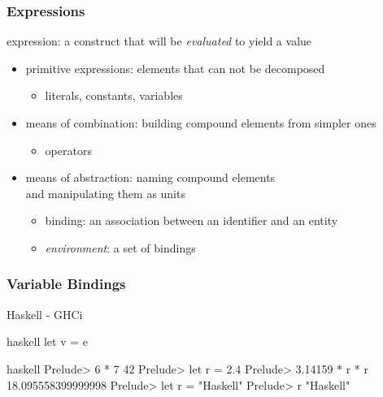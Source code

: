 \documentclass[dvipsnames]{beamer}
\theoremstyle{plain}
\begin{document}
\begin{frame}
  \frametitle{Expressions}

  \begin{definition}
    \alert{expression}: a construct that will be \emph{evaluated} to yield a value
  \end{definition}

  \pause
  \medskip
  \begin{itemize}
    \item primitive expressions: elements that can not be decomposed\\
    \begin{itemize}
      \item literals, constants, variables
    \end{itemize}
    \item means of combination: building compound elements from simpler ones\\
    \begin{itemize}
      \item operators
    \end{itemize}
    \item means of abstraction: naming compound elements\\
      and manipulating them as units
    \begin{itemize}
      \item \alert{binding}: an association between an identifier and an entity
      \item \emph{environment}: a set of bindings
    \end{itemize}
  \end{itemize}
\end{frame}

\begin{frame}[fragile]
  \frametitle{Variable Bindings}

  \begin{block}{Haskell - GHCi}
    \begin{pygments}{haskell}
let v = e
    \end{pygments}
  \end{block}

  \begin{example}
    \begin{pygments}{haskell}
Prelude> 6 * 7
42
Prelude> let r = 2.4
Prelude> 3.14159 * r * r
18.095558399999998
Prelude> let r = "Haskell"
Prelude> r
"Haskell"
    \end{pygments}
  \end{example}
\end{frame}
\end{document}
